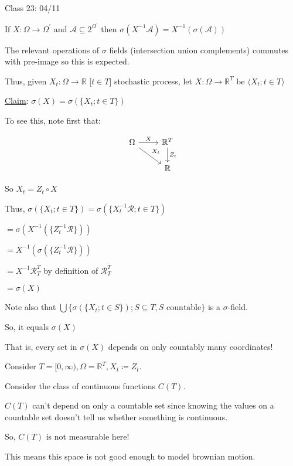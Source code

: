 \documentclass{article}
\theoremstyle{definition}
\begin{document}
\hrulefill

Class 23: 04/11

If \(X: \Omega \to \Omega ^{\prime} \) and \(\mathscr{A} \subseteq 2 ^{\Omega ^{\prime} }\) then \(\sigma (X ^{-1} \mathscr{A}) = X ^{-1} (\sigma(\mathscr{A}))\)

The relevant operations of \(\sigma\) fields (intersection union complements) commutes with pre-image so this is expected.

Thus, given \(X_t : \Omega \to \mathbb{R}\) [\(t\in T\)] stochastic process, let \(X: \Omega \to \mathbb{R}^T\) be \(\langle X_t ; t\in T \rangle \)  

\underline{Claim}: \(\sigma(X) = \sigma(\{ X_t; t\in T \} )\) 

To see this, note first that:

\[
    \begin{tikzcd}
        \Omega \ar[r,"X"] \ar[rd,"X_t"] & \mathbb{R}^T \ar[d,"Z_t"] \\ & \mathbb{R} 
    \end{tikzcd}
\]

So \(X_t = Z_t \circ X\) 

Thus, \(\sigma (\{ X_t ; t\in T \} )= \sigma (\{ X_t ^{-1} \mathcal{R} ; t\in T \} )\)

\(= \sigma(X ^{-1} (\{ Z_t ^{-1} \mathcal{R} \} ))\) 

\(= X ^{-1} (\sigma(\{ Z_t ^{-1} \mathcal{R} \} ))\) 

\(= X ^{-1} \mathcal{R}^T_T\) by definition of \(\mathcal{R}^T_T\) 

\(= \sigma(X)\) 

Note also that \(\bigcup \{ \sigma (\{ X_t ; t\in S \} ) ; S \subseteq T, S \text{ countable}  \} \) is a \(\sigma\)-field.

So, it equals \(\sigma (X)\)

That is, every set in \(\sigma (X)\) depends on only countably many coordinates!

Consider \(T = [0,\infty), \Omega = \mathbb{R}^T, X_t \coloneqq Z_t\).

Consider the class of continuous functions \(C(T)\).

\(C(T)\) can't depend on only a countable set since knowing the values on a countable set doesn't tell us whether something is continuous.

So, \(C(T)\) is not measurable here!

This means this space is not good enough to model brownian motion.
\end{document}
